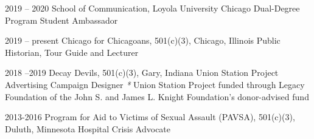 \begin{cvskills}
    \cvskill
    {2019 -- 2020} %
    {School of Communication, Loyola University Chicago} %
    {Dual-Degree Program Student Ambassador} %

    \cvskill
    {2019 -- present} 
    {Chicago for Chicagoans, 501(c)(3), Chicago, Illinois } 
    {Public Historian, Tour Guide and Lecturer} 
    
    \cvskill
    {2018 --2019} %
    {Decay Devils, 501(c)(3), Gary, Indiana } %
    {Union Station Project Advertising Campaign Designer \scriptsize{\textit{*} Union Station Project funded through Legacy Foundation of the John S. and James L. Knight Foundation's donor-advised fund}} %
    

    \cvskill
    {2013-2016} 
    {Program for Aid to Victims of Sexual Assault (PAVSA), 501(c)(3), Duluth, Minnesota} 
    {Hospital Crisis Advocate} 
    
%	
\end{cvskills}


